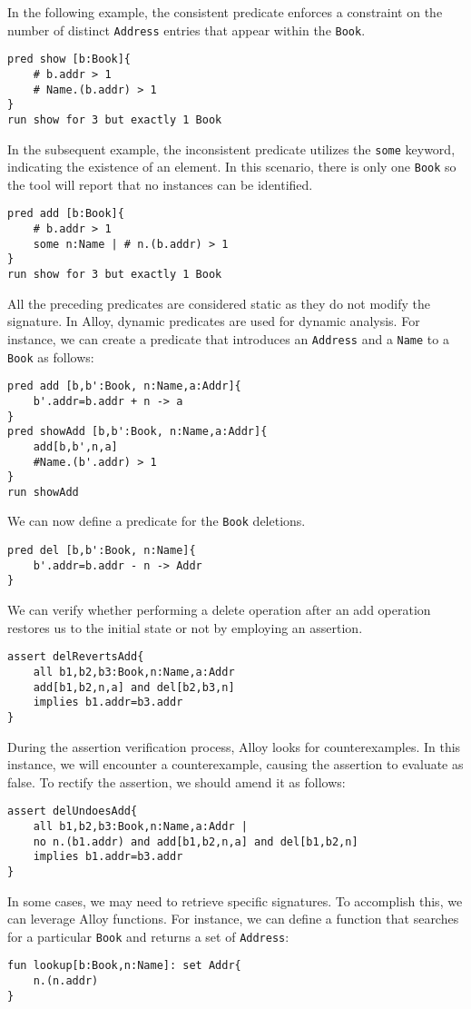 In the following example, the consistent predicate enforces a constraint on the number of distinct \texttt{Address} entries that appear within the \texttt{Book}.
\begin{lstlisting}[language=alloy]
pred show [b:Book]{
    # b.addr > 1
    # Name.(b.addr) > 1
}
run show for 3 but exactly 1 Book
\end{lstlisting}
In the subsequent example, the inconsistent predicate utilizes the \texttt{some} keyword, indicating the existence of an element. 
In this scenario, there is only one \texttt{Book} so the tool will report that no instances can be identified.
\begin{lstlisting}[language=alloy]
pred add [b:Book]{
    # b.addr > 1
    some n:Name | # n.(b.addr) > 1
}
run show for 3 but exactly 1 Book
\end{lstlisting}
All the preceding predicates are considered static as they do not modify the signature. 
In Alloy, dynamic predicates are used for dynamic analysis. 
For instance, we can create a predicate that introduces an \texttt{Address} and a \texttt{Name} to a \texttt{Book} as follows:
\begin{lstlisting}[language=alloy]
pred add [b,b':Book, n:Name,a:Addr]{
    b'.addr=b.addr + n -> a
}
pred showAdd [b,b':Book, n:Name,a:Addr]{
    add[b,b',n,a]
    #Name.(b'.addr) > 1
}
run showAdd
\end{lstlisting}
We can now define a predicate for the \texttt{Book} deletions.  
\begin{lstlisting}[language=alloy]
pred del [b,b':Book, n:Name]{
    b'.addr=b.addr - n -> Addr
}
\end{lstlisting}
We can verify whether performing a delete operation after an add operation restores us to the initial state or not by employing an assertion. 
\begin{lstlisting}[language=alloy]
assert delRevertsAdd{
    all b1,b2,b3:Book,n:Name,a:Addr
    add[b1,b2,n,a] and del[b2,b3,n]
    implies b1.addr=b3.addr
}
\end{lstlisting}
During the assertion verification process, Alloy looks for counterexamples. 
In this instance, we will encounter a counterexample, causing the assertion to evaluate as false.
To rectify the assertion, we should amend it as follows:
\begin{lstlisting}[language=alloy]
assert delUndoesAdd{
    all b1,b2,b3:Book,n:Name,a:Addr |
    no n.(b1.addr) and add[b1,b2,n,a] and del[b1,b2,n]
    implies b1.addr=b3.addr
}
\end{lstlisting}
In some cases, we may need to retrieve specific signatures. 
To accomplish this, we can leverage Alloy functions. 
For instance, we can define a function that searches for a particular \texttt{Book} and returns a set of \texttt{Address}:        
\begin{lstlisting}[language=alloy]
fun lookup[b:Book,n:Name]: set Addr{
    n.(n.addr)
}
\end{lstlisting}